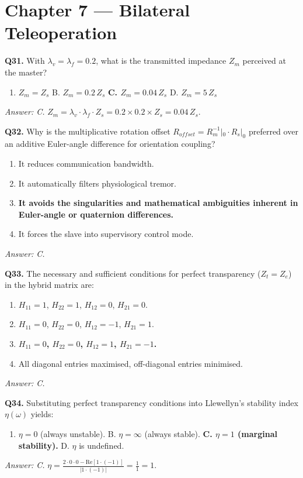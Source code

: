 \documentclass[11pt,a4paper,twoside]{report}
\begin{document}
\section{Chapter 7 — Bilateral Teleoperation}

\textbf{Q31.} With $\lambda_v = \lambda_f = 0.2$, what is the transmitted impedance $Z_m$ perceived at the master?
\begin{enumerate}[label=\Alph*.]
    \item $Z_m = Z_s$ \quad B. $Z_m = 0.2\,Z_s$ \quad \textbf{C. $Z_m = 0.04\,Z_s$} \quad D. $Z_m = 5\,Z_s$
\end{enumerate}
\textit{Answer: C.} $Z_m = \lambda_v \cdot \lambda_f \cdot Z_s = 0.2 \times 0.2 \times Z_s = 0.04\,Z_s$.

\bigskip
\textbf{Q32.} Why is the multiplicative rotation offset $R_{offset} = R_m^{-1}|_0 \cdot R_s|_0$ preferred over an additive Euler-angle difference for orientation coupling?
\begin{enumerate}[label=\Alph*.]
    \item It reduces communication bandwidth.
    \item It automatically filters physiological tremor.
    \item \textbf{It avoids the singularities and mathematical ambiguities inherent in Euler-angle or quaternion differences.}
    \item It forces the slave into supervisory control mode.
\end{enumerate}
\textit{Answer: C.}

\bigskip
\textbf{Q33.} The necessary and sufficient conditions for perfect transparency ($Z_t = Z_e$) in the hybrid matrix are:
\begin{enumerate}[label=\Alph*.]
    \item $H_{11}=1$, $H_{22}=1$, $H_{12}=0$, $H_{21}=0$.
    \item $H_{11}=0$, $H_{22}=0$, $H_{12}=-1$, $H_{21}=1$.
    \item \textbf{$H_{11}=0$, $H_{22}=0$, $H_{12}=1$, $H_{21}=-1$.}
    \item All diagonal entries maximised, off-diagonal entries minimised.
\end{enumerate}
\textit{Answer: C.}

\bigskip
\textbf{Q34.} Substituting perfect transparency conditions into Llewellyn's stability index $\eta(\omega)$ yields:
\begin{enumerate}[label=\Alph*.]
    \item $\eta = 0$ (always unstable). \quad B. $\eta = \infty$ (always stable). \quad \textbf{C. $\eta = 1$ (marginal stability).} \quad D. $\eta$ is undefined.
\end{enumerate}
\textit{Answer: C.} $\eta = \frac{2 \cdot 0 \cdot 0 - \text{Re}[1\cdot(-1)]}{|1\cdot(-1)|} = \frac{1}{1} = 1$.
\end{document}
